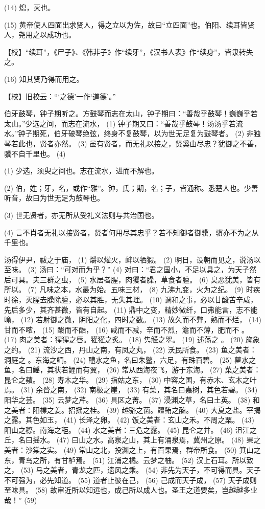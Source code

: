\documentclass[12pt,UTF8]{ctexbook}
\begin{document}
(14) 熄，灭也。

(15) 黄帝使人四面出求贤人，得之立以为佐，故曰“立四面”也。伯阳、续耳皆贤人，尧用之以成功也。

【校】“续耳”，《尸子》、《韩非子》作“续牙”，《汉书人表》作“续身”，皆隶转失之。

(16) 知其贤乃得而用之。

【校】旧校云：“‘之德’一作‘道德’。”

伯牙鼓琴，钟子期听之。方鼓琴而志在太山，钟子期曰：“善哉乎鼓琴！巍巍乎若太山。”少选之间，而志在流水， (1) 钟子期又曰：“善哉乎鼓琴！汤汤乎若流水。”钟子期死，伯牙破琴绝弦，终身不复鼓琴，以为世无足复为鼓琴者。 (2) 非独琴若此也，贤者亦然。 (3) 虽有贤者，而无礼以接之，贤奚由尽忠？犹御之不善，骥不自千里也。 (4)

(1) 少选，须臾之间也。志在流水，进而不解也。

(2) 伯，姓；牙，名，或作“雅”。钟，氏；期，名；子，皆通称。悉楚人也。少善听音，故曰为世无足为鼓琴也。

(3) 世无贤者，亦无所从受礼义法则与共治国也。

(4) 言不肖者无礼以接贤者，贤者何用尽其忠乎？若不知御者御骥，骥亦不为之从千里也。

汤得伊尹，祓之于庙， (1) 爝以爟火，衅以牺猳。 (2) 明日，设朝而见之，说汤以至味。 (3) 汤曰：“可对而为乎？” (4) 对曰：“君之国小，不足以具之，为天子然后可具。夫三群之虫， (5) 水居者腥，肉玃者臊，草食者膻。 (6) 臭恶犹美，皆有所以。 (7) 凡味之本，水最为始。五味三材， (8) 九沸九变，火为之纪。 (9) 时疾时徐，灭腥去臊除膻，必以其胜，无失其理。 (10) 调和之事，必以甘酸苦辛咸，先后多少，其齐甚微，皆有自起。 (11) 鼎中之变，精妙微纤，口弗能言，志不能喻， (12) 若射御之微，阴阳之化，四时之数。 (13) 故久而不弊，熟而不烂， (14) 甘而不哝， (15) 酸而不酷， (16) 咸而不减，辛而不烈，澹而不薄，肥而不 。 (17) 肉之美者：猩猩之唇。獾獾之炙。 (18) 隽觾之翠。 (19) 述荡之 。 (20) 旄象之约。 (21) 流沙之西，丹山之南，有凤之丸， (22) 沃民所食。 (23) 鱼之美者：洞庭之 。东海之鲕。 (24) 醴水之鱼，名曰朱鳖，六足，有珠百碧。 (25) 雚水之鱼，名曰鳐，其状若鲤而有翼， (26) 常从西海夜飞，游于东海。 (27) 菜之美者：昆仑之蘋。 (28) 寿木之华。 (29) 指姑之东， (30) 中容之国，有赤木、玄木之叶焉。 (31) 余瞀之南， (32) 南极之崖， (33) 有菜，其名曰嘉树，其色若碧。 (34) 阳华之芸。 (35) 云梦之芹。 (36) 具区之菁。 (37) 浸渊之草，名曰土英。 (38) 和之美者：阳檏之姜。招摇之桂。 (39) 越骆之菌。鳣鲔之醢。 (40) 大夏之盐。宰揭之露。其色如玉， (41) 长泽之卵。 (42) 饭之美者：玄山之禾。不周之粟。 (43) 阳山之穄。南海之秬。 (44) 水之美者：三危之露。 (45) 昆仑之井。 (46) 沮江之丘，名曰摇水。 (47) 曰山之水。高泉之山，其上有涌泉焉，冀州之原。 (48) 果之美者：沙棠之实。 (49) 常山之北，投渊之上，有百果焉，群帝所食。 (50) 箕山之东，青鸟之所，有甘栌焉。 (51) 江浦之橘。云梦之柚。 (52) 汉上石耳。所以致之， (53) 马之美者，青龙之匹，遗风之乘。 (54) 非先为天子，不可得而具。天子不可强为，必先知道。 (55) 道者止彼在己， (56) 己成而天子成， (57) 天子成则至味具。 (58) 故审近所以知远也，成己所以成人也。圣王之道要矣，岂越越多业哉！” (59)
\end{document}
